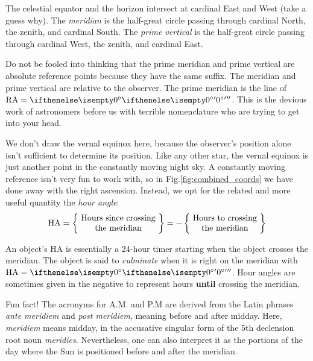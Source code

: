 \documentclass{article}
\begin{document}
The celestial equator and the horizon intersect at cardinal East and West (take a guess why). The \textit{meridian} is the half-great circle passing through cardinal North, the zenith, and cardinal South. The \textit{prime vertical} is the half-great circle passing through cardinal West, the zenith, and cardinal East. 

Do not be fooled into thinking that the prime meridian and prime vertical are absolute reference points because they have the same suffix. The meridian and prime vertical are relative to the observer. The prime meridian is the line of $\RA = \sexg{0}{}{}$. This is the devious work of astronomers before us with terrible nomenclature who are trying to get into your head.

We don't draw the vernal equinox here, because the observer's position alone isn't sufficient to determine its position. Like any other star, the vernal equinox is just another point in the constantly moving night sky. A constantly moving reference isn't very fun to work with, so in Fig.\;\ref{fig:combined_coords} we have done away with the right ascension. Instead, we opt for the related and more useful quantity the \textit{hour angle}:
\begin{equation}
    \HA = \left\{\ 
    \begin{matrix} 
        \text{Hours since crossing} \\ 
        \text{the meridian} 
    \end{matrix}
    \ \right\}
    = - \left\{\ 
    \begin{matrix} 
        \text{Hours to crossing} \\ 
        \text{the meridian} 
    \end{matrix}
    \ \right\}
    \label{eqn:ha_definition}
\end{equation}

An object's HA is essentially a 24-hour timer starting when the object crosses the meridian. The object is said to \textit{culminate} when it is right on the meridian with $\HA = \sexg{0}{}{}$. Hour angles are sometimes given in the negative to represent hours \textbf{until} crossing the meridian. 

Fun fact! The acronyms for A.M. and P.M are derived from the Latin phrases \textit{ante meridiem} and \textit{post meridiem}, meaning before and after midday. Here, \textit{meridiem} means midday, in the accusative singular form of the 5th declension root noun \textit{meridies}. Nevertheless, one can also interpret it as the portions of the day where the Sun is positioned before and after the meridian.
\end{document}
